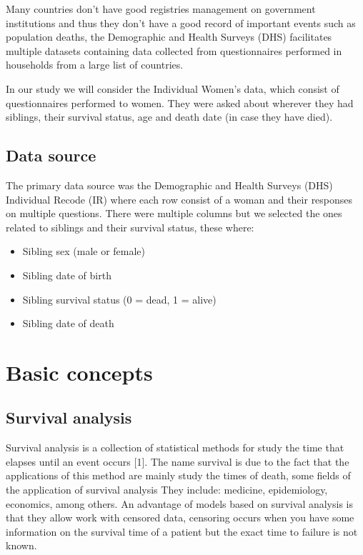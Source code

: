 \documentclass[
  twocolumn]{article}
\providecommand{\tightlist}{%
  \setlength{\itemsep}{0pt}\setlength{\parskip}{0pt}}
\begin{document}
Many countries don't have good registries management on government
institutions and thus they don't have a good record of important events
such as population deaths, the Demographic and Health Surveys (DHS)
facilitates multiple datasets containing data collected from
questionnaires performed in households from a large list of countries.

In our study we will consider the Individual Women's data, which consist
of questionnaires performed to women. They were asked about wherever
they had siblings, their survival status, age and death date (in case
they have died).

\hypertarget{data-source}{%
\subsection{Data source}\label{data-source}}

The primary data source was the Demographic and Health Surveys (DHS)
Individual Recode (IR) where each row consist of a woman and their
responses on multiple questions. There were multiple columns but we
selected the ones related to siblings and their survival status, these
where:

\begin{itemize}
\tightlist
\item
  Sibling sex (male or female)
\item
  Sibling date of birth
\item
  Sibling survival status (0 = dead, 1 = alive)
\item
  Sibling date of death
\end{itemize}

\hypertarget{basic-concepts}{%
\section{Basic concepts}\label{basic-concepts}}

\hypertarget{survival-analysis}{%
\subsection{Survival analysis}\label{survival-analysis}}

Survival analysis is a collection of statistical methods for study the
time that elapses until an event occurs {[}1{]}. The name survival is
due to the fact that the applications of this method are mainly study
the times of death, some fields of the application of survival analysis
They include: medicine, epidemiology, economics, among others. An
advantage of models based on survival analysis is that they allow work
with censored data, censoring occurs when you have some information on
the survival time of a patient but the exact time to failure is not
known.
\end{document}
